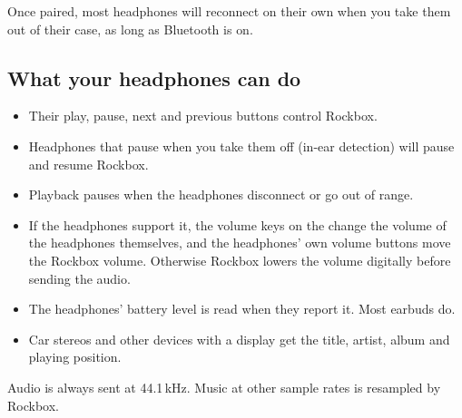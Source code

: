 Once paired, most headphones will reconnect on their own when you take them
out of their case, as long as Bluetooth is on.

\subsection{What your headphones can do}
\begin{itemize}
  \item Their play, pause, next and previous buttons control Rockbox.
  \item Headphones that pause when you take them off (in-ear detection) will
    pause and resume Rockbox.
  \item Playback pauses when the headphones disconnect or go out of range.
  \item If the headphones support it, the volume keys on the \dap{} change the
    volume of the headphones themselves, and the headphones' own volume
    buttons move the Rockbox volume. Otherwise Rockbox lowers the volume
    digitally before sending the audio.
  \item The headphones' battery level is read when they report it. Most
    earbuds do.
  \item Car stereos and other devices with a display get the title, artist,
    album and playing position.
\end{itemize}

Audio is always sent at 44.1\,kHz. Music at other sample rates is resampled
by Rockbox.

